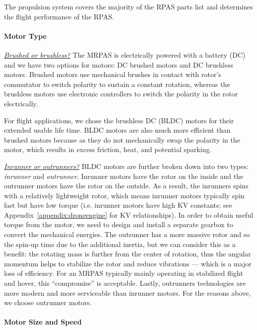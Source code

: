 The propulsion system covers the majority of the RPAS parts list and determines the flight performance of the RPAS. 

\paragraph{Motor Type}

\underline{\textit{Brushed or brushless?}}
The MRPAS is electrically powered with a battery (DC) and we have two options for motors: DC brushed  motors and DC brushless motors. Brushed motors use mechanical brushes in contact with rotor’s commutator to switch polarity to sustain a constant rotation, whereas the brushless motors use electronic controllers to switch the polarity in the rotor electrically. 

For flight applications, we chose the brushless DC (BLDC) motors for their extended usable life time. BLDC motors are also much more efficient than brushed motors because as they do not mechanically swap the polarity in the motor, which results in excess friction, heat, and potential sparking. 

\underline{\textit{Inrunner or outrunners?}}
BLDC motors are further broken down into two types: \textit{inrunner} and \textit{outrunner}. Inrunner motors have the rotor on the inside and the outrunner motors have the rotor on the outside.  As a result, the inrunners spins with a relatively lightweight rotor, which means inrunner motors typically spin fast but have low torque (i.e. inrunner motors have high KV constants; see Appendix~\ref{appendix:droneengine} for KV relationships). In order to obtain useful torque from the motor, we need to design and install a separate gearbox to convert the mechanical energies\cite{invsoutrunner}. The outrunner has a more massive rotor and so the spin-up time due to the additional inertia, but we can consider this as a benefit: the rotating mass is further from the center of rotation, thus the angular momentum helps to stabilize the rotor and reduce vibrations --- which is a major loss of efficiency. For an MRPAS typically mainly operating in stabilized flight and hover, this ``compromise'' is acceptable. Lastly, outrunners technologies are more modern and more serviceable than inrunner motors\cite{invsoutrunner}. For the reasons above, we choose outrunner motors.

\paragraph{Motor Size and Speed}\label{section:motor-speed}

